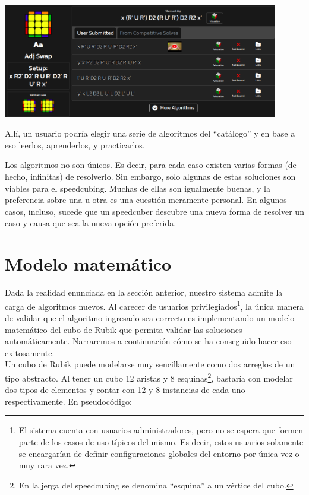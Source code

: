 \begin{multicols}{2}
\begin{Figure}
\centering
    \includegraphics[width=0.9\textwidth]{img/aperm-speedcubedb.png}
 \label{fig:aperm-speedcubedb}
\end{Figure}

Allí, un usuario podría elegir una serie de algoritmos del ``catálogo'' y en base a eso leerlos, aprenderlos, y practicarlos.

Los algoritmos no son únicos. Es decir, para cada caso existen varias formas (de hecho, infinitas) de resolverlo. Sin embargo, solo algunas de estas soluciones son viables para el speedcubing. Muchas de ellas son igualmente buenas, y la preferencia sobre una u otra es una cuestión meramente personal.
En algunos casos, incluso, sucede que un speedcuber descubre una nueva forma de resolver un caso y causa que sea la nueva opción preferida.

\section{Modelo matemático}

Dada la realidad enunciada en la sección anterior, nuestro sistema admite la carga de algoritmos nuevos. Al carecer de usuarios privilegiados\footnote{El sistema cuenta con usuarios administradores, pero no se espera que formen parte de los casos de uso típicos del mismo. Es decir, estos usuarios solamente se encargarían de definir configuraciones globales del entorno por única vez o muy rara vez.}, la única manera de validar que el algoritmo ingresado sea correcto es implementando un modelo matemático del cubo de Rubik que permita validar las soluciones automáticamente. Narraremos a continuación cómo se ha conseguido hacer eso exitosamente.\\

Un cubo de Rubik puede modelarse muy sencillamente como dos arreglos de un tipo abstracto. Al tener un cubo 12 aristas y 8 esquinas\footnote{En la jerga del speedcubing se denomina ``esquina'' a un vértice del cubo.}, bastaría con modelar dos tipos de elementos y contar con 12 y 8 instancias de cada uno respectivamente. En pseudocódigo:


\end{multicols}
